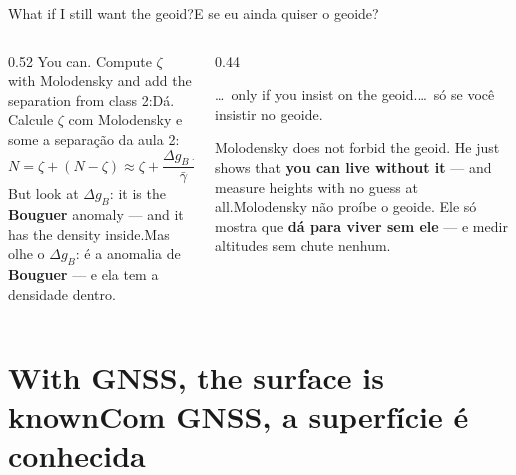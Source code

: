 \documentclass[aspectratio=169,11pt]{beamer}
\newcommand{\tr}[2]{\ifEN#2\else#1\fi}
\newcommand{\bnum}[1]{\textbf{\textcolor{mTeal}{#1}}}
\begin{document}
\begin{frame}{\tr{E se eu ainda quiser o geoide?}{What if I still want the geoid?}}
  \begin{columns}[T]
    \begin{column}{0.52\textwidth}
      \tr{Dá. Calcule $\zeta$ com Molodensky e some a separação da aula 2:}{You can. Compute
      $\zeta$ with Molodensky and add the separation from class 2:}
      \[ N = \zeta + (N - \zeta) \approx \zeta + \frac{\Delta g_B\,H}{\bar\gamma} \]
      \tr{Mas olhe o $\Delta g_B$: é a anomalia de \bnum{Bouguer} --- e ela tem a densidade
      dentro.}{But look at $\Delta g_B$: it is the \bnum{Bouguer} anomaly --- and it has the
      density inside.}
    \end{column}
    \begin{column}{0.44\textwidth}
      \begin{armadilha}[title={\tr{A densidade volta\ldots}{The density comes back\ldots}}]
        \tr{\ldots\ \alert{só se você insistir no geoide}.}{\ldots\ \alert{only if you insist on
        the geoid}.}
      \end{armadilha}
      \medskip
      \begin{ideia}
        \small\tr{Molodensky não proíbe o geoide. Ele só mostra que \bnum{dá para viver sem
        ele} --- e medir altitudes sem chute nenhum.}{Molodensky does not forbid the geoid. He
        just shows that \bnum{you can live without it} --- and measure heights with no guess
        at all.}
      \end{ideia}
    \end{column}
  \end{columns}
\end{frame}

\section{\tr{Com GNSS, a superfície é conhecida}{With GNSS, the surface is known}}
\end{document}
